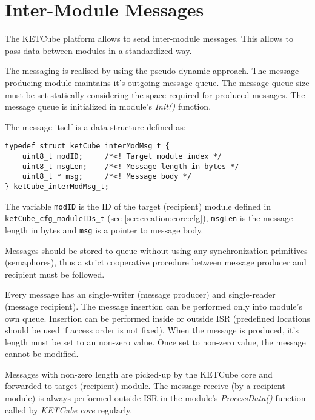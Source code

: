 
\clearpage
\section{Inter-Module Messages}\label{sec:msg}
The KETCube platform allows to send inter-module messages. This allows to pass data between modules in a standardized way.

The messaging is realised by using the pseudo-dynamic approach. The message producing module  maintains it's outgoing message queue. The message queue size must be set statically considering the space required for produced messages. The message queue is initialized in module's {\it Init()} function.

The message itself is a data structure defined as:
\begin{docCodeListing}
\begin{verbatim}
typedef struct ketCube_interModMsg_t {
    uint8_t modID;     /*<! Target module index */
    uint8_t msgLen;    /*<! Message length in bytes */
    uint8_t * msg;     /*<! Message body */
} ketCube_interModMsg_t;
\end{verbatim}
\end{docCodeListing}

The variable {\tt modID} is the ID of the target (recipient) module defined in {\tt ketCube\_cfg\_moduleIDs\_t} (see \ref{sec:creation:core:cfg}), {\tt msgLen} is the message length in bytes and {\tt *msg} is a pointer to message body.

Messages should be stored to queue without using any synchronization primitives (semaphores), thus a strict cooperative procedure between message producer and recipient must be followed. 

Every message has an single-writer (message producer) and single-reader (message recipient). The message insertion can be performed only into module's own queue. Insertion can be performed inside or outside ISR (predefined locations should be used if access order is not fixed). When the message is produced, it's length must be set to an non-zero value. Once set to non-zero value, the message cannot be modified.

Messages with non-zero length are picked-up by the KETCube core and forwarded to target (recipient) module. The message receive (by a recipient module) is always performed outside ISR in the module's {\it ProcessData()} function called by {\it KETCube core} regularly.

